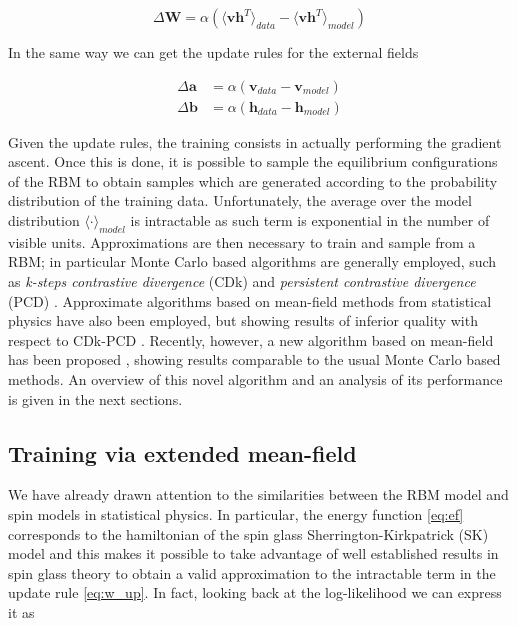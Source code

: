 \documentclass[notitlepage]{revtex4-1}
\begin{document}
\begin{equation}
\Delta \mathbf{W} = \alpha \left( \langle \mathbf{v h}^T \rangle_{data} - \langle \mathbf{v h}^T \rangle_{model} \right)
\label{eq:w_up}
\end{equation}

In the same way we can get the update rules for the external fields

\begin{align}
\Delta \mathbf{a} &= \alpha \left( \mathbf{v}_{data} - \mathbf{v}_{model} \right) \\
\Delta \mathbf{b} &= \alpha \left( \mathbf{h}_{data} - \mathbf{h}_{model} \right)
\end{align}

Given the update rules, the training consists in actually performing the gradient ascent. Once this is done, it is possible to sample the equilibrium configurations of the RBM to obtain samples which are generated according to the probability distribution of the training data. Unfortunately, the average over the model distribution \(\textstyle \langle \cdot \rangle_{model}\) is intractable as such term is exponential in the number of visible units. Approximations are then necessary to train and sample from a RBM; in particular Monte Carlo based algorithms are generally employed, such as \textit{k-steps contrastive divergence} (CDk) \cite{Hinton_CD}  and \textit{persistent contrastive divergence} (PCD) \cite{PCD}. Approximate algorithms based on mean-field methods from statistical physics have also been employed, but showing results of inferior quality with respect to CDk-PCD \cite{PCD}. Recently, however, a new algorithm based on mean-field has been proposed \cite{tap_train}, showing results comparable to the usual Monte Carlo based methods. An overview of this novel algorithm and an analysis of its performance is given in the next sections.

\subsection{Training via extended mean-field} \label{sec:emf}
We have already drawn attention to the similarities between the RBM model and spin models in statistical physics. In particular, the energy function \eqref{eq:ef} corresponds to the hamiltonian of the spin glass Sherrington-Kirkpatrick (SK) model \cite{SK} and this makes it possible to take advantage of well established results in spin glass theory to obtain a valid approximation to the intractable term in the update rule \eqref{eq:w_up}. In fact, looking back at the log-likelihood we can express it as
\end{document}
